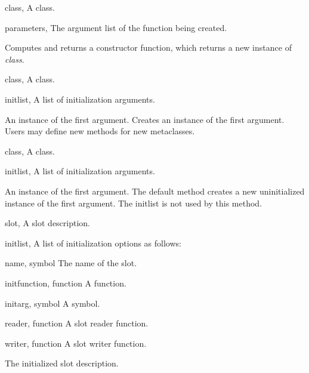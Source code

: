 \begin{optDefinition}
%
\begin{specargs}
    \item[class, \classref{class}] A class.
    \item[parameters, \classref{list}] The argument list of the function being
    created.
\end{specargs}
%
\result%
Computes and returns a constructor function, which returns a new
instance of {\em class}.

%
\begin{genericargs}
    \item[class, \classref{class}] A class.
    \item[initlist, \classref{list}] A list of initialization arguments.
\end{genericargs}
%
\result%
An instance of the first argument.
%
\remarks%
Creates an instance of the first argument.  Users may define new
methods for new metaclasses.

%
\begin{specargs}
    \item[class, \classref{class}] A class.
    \item[initlist, \classref{list}] A list of initialization arguments.
\end{specargs}
%
\result%
An instance of the first argument.
%
\remarks%
The default method creates a new uninitialized instance of the first
argument.  The initlist is not used by this  method.
%
\end{optDefinition}

%
\begin{optDefinition}
%
%
\begin{specargs}
    \item[slot, \classref{slot}] A slot description.
    \item[initlist, \classref{list}] A list of initialization options as follows:
    \begin{options}
        \item[name, symbol] The name of the slot.
        \item[initfunction, function] A function.
        \item[initarg, symbol] A symbol.
        \item[reader, function] A slot reader function.
        \item[writer, function] A slot writer function.
    \end{options}
\end{specargs}
%
\result%
The initialized slot description.
%
\end{optDefinition}

